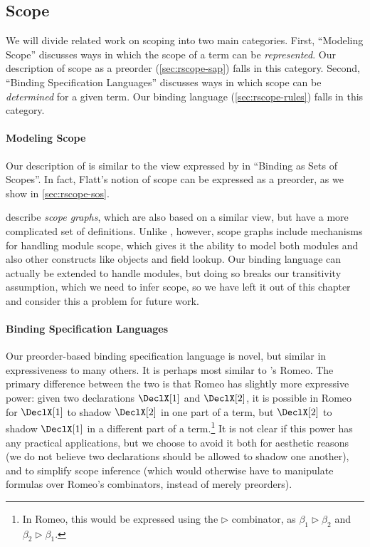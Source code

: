 \subsection{Scope}

We will divide related work on scoping into two main categories.
First, ``Modeling Scope'' discusses ways in which the scope of a term
can be \emph{represented}. Our description of scope as a
preorder (\cref{sec:rscope-sap}) falls in this category.
Second, ``Binding Specification Languages'' discusses ways in which scope
can be \emph{determined} for a given term. Our binding
language (\cref{sec:rscope-rules}) falls in this category.

\paragraph{Modeling Scope}

Our description of {\sap} is similar to the view
expressed by \cite{flatt:scope} in ``Binding as Sets of Scopes''.
In fact, Flatt's notion of scope can be expressed as a preorder,
as we show in \cref{sec:rscope-sos}.

\cite{neron-scope} describe \emph{scope graphs}, which are also based on a
similar view, but have a more complicated set of definitions.
Unlike {\sap}, however, scope graphs include mechanisms for handling
module scope, which gives it the ability to model both modules and
also other constructs like objects and field lookup.
Our {\sap} binding language can actually be extended to
handle modules, but doing so breaks our transitivity
assumption, which we need to infer scope, so we have left it out of
this chapter and consider this a problem for
future work.

\paragraph{Binding Specification Languages}

Our preorder-based binding specification language is novel, but
similar in expressiveness to many others.  It is perhaps most similar
to \cite{stansifer-romeo}'s Romeo.
The primary difference between the two is that
Romeo has slightly more expressive power: given two declarations
$\DeclX[1]$ and $\DeclX[2]$, it is possible in Romeo for $\DeclX[1]$
to shadow $\DeclX[2]$ in one part of a term, but $\DeclX[2]$ to shadow
$\DeclX[1]$ in a different part of a term.\footnote{
  In Romeo, this would be expressed using the $\rhd$ combinator,
  as $\beta_1 \rhd \beta_2$ and $\beta_2 \rhd \beta_1$.
} It is not clear
if this power has any practical applications, but we choose to avoid
it both for aesthetic reasons (we do not believe two declarations
should be allowed to shadow one another), and to simplify scope
inference (which would otherwise have to manipulate formulas over
Romeo's combinators, instead of merely preorders).

